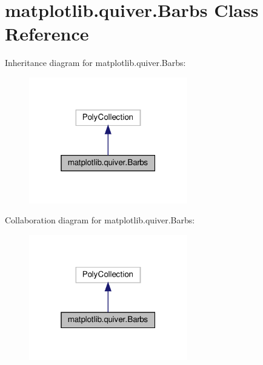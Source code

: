 \hypertarget{classmatplotlib_1_1quiver_1_1Barbs}{}\section{matplotlib.\+quiver.\+Barbs Class Reference}
\label{classmatplotlib_1_1quiver_1_1Barbs}


Inheritance diagram for matplotlib.\+quiver.\+Barbs\+:
\nopagebreak
\begin{figure}[H]
\begin{center}
\leavevmode
\includegraphics[width=196pt]{classmatplotlib_1_1quiver_1_1Barbs__inherit__graph}
\end{center}
\end{figure}


Collaboration diagram for matplotlib.\+quiver.\+Barbs\+:
\nopagebreak
\begin{figure}[H]
\begin{center}
\leavevmode
\includegraphics[width=196pt]{classmatplotlib_1_1quiver_1_1Barbs__coll__graph}
\end{center}
\end{figure}
